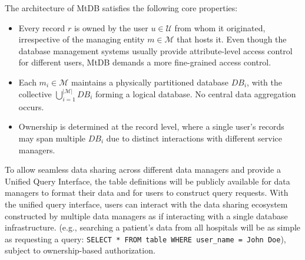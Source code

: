 \documentclass[conference]{IEEEtran}
\newcommand{\wenyi}[1]{ {\color{blue}{#1}}}
\newcommand{\seokki}[1]{ {\color{orange}{#1}}}
\newcommand{\ours}{\xspace MtDB\xspace}
\begin{document}
The architecture of \ours satisfies the following core properties:  
\begin{itemize}
    \item Every record $r$ is owned by the user $u \in \mathcal{U}$ from whom it originated, irrespective of the managing entity $m \in \mathcal{M}$ that hosts it. Even though the database management systems usually provide attribute-level access control for different users, \ours demands a more fine-grained access control.
    \item Each $m_i \in \mathcal{M}$ maintains a physically partitioned database $DB_i$, with the collective $\bigcup_{i=1}^{|\mathcal{M}|} DB_i$ forming a logical database. No central data aggregation occurs.  
    \item Ownership is determined at the record level, where a single user's records may span multiple $DB_i$ due to distinct interactions with different service managers. 
\end{itemize}



To allow seamless data sharing across different data managers and provide a Unified Query Interface, the table definitions will be publicly available for data managers to format their data and for users to construct query requests. With the unified query interface, users can interact with the data sharing ecosystem constructed by multiple data managers as if interacting with a single database infrastructure.
(e.g., searching a patient's data from all hospitals will be as simple as requesting a query: \lstinline{SELECT * FROM table WHERE user_name = John Doe}), subject to ownership-based authorization. 
\end{document}
